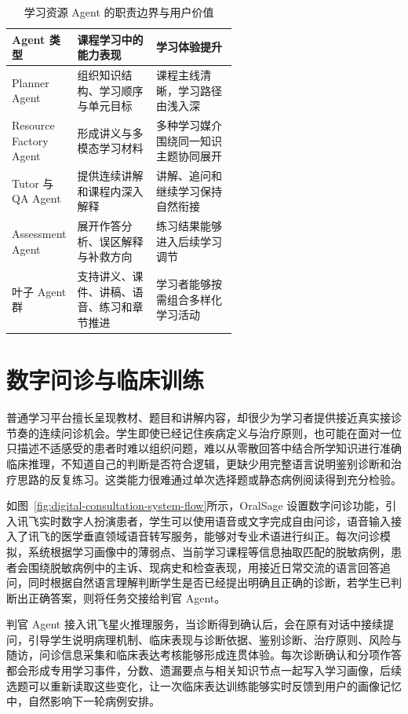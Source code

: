 \begin{table}[H]
  \centering
  \caption{学习资源 Agent 的职责边界与用户价值}
  \label{tab:agent-boundaries}
  \begin{tabularx}{\linewidth}{p{0.22\linewidth}p{0.35\linewidth}X}
    \toprule
    Agent 类型 & 课程学习中的能力表现 & 学习体验提升 \\
    \midrule
    Planner Agent & 组织知识结构、学习顺序与单元目标 & 课程主线清晰，学习路径由浅入深 \\
    Resource Factory Agent & 形成讲义与多模态学习材料 & 多种学习媒介围绕同一知识主题协同展开 \\
    Tutor 与 QA Agent & 提供连续讲解和课程内深入解释 & 讲解、追问和继续学习保持自然衔接 \\
    Assessment Agent & 展开作答分析、误区解释与补救方向 & 练习结果能够进入后续学习调节 \\
    叶子 Agent 群 & 支持讲义、课件、讲稿、语音、练习和章节推进 & 学习者能够按需组合多样化学习活动 \\
    \bottomrule
  \end{tabularx}
\end{table}

\section{数字问诊与临床训练}
\label{sec:digital-consultation}

普通学习平台擅长呈现教材、题目和讲解内容，却很少为学习者提供接近真实接诊节奏的连续问诊机会。学生即使已经记住疾病定义与治疗原则，也可能在面对一位只描述不适感受的患者时难以组织问题，难以从零散回答中结合所学知识进行准确临床推理，不知道自己的判断是否符合逻辑，更缺少用完整语言说明鉴别诊断和治疗思路的反复练习。这类能力很难通过单次选择题或静态病例阅读得到充分检验。

如图~\ref{fig:digital-consultation-system-flow}所示，OralSage 设置数字问诊功能，引入讯飞实时数字人扮演患者，学生可以使用语音或文字完成自由问诊，语音输入接入了讯飞的医学垂直领域语音转写服务，能够对专业术语进行纠正。每次问诊模拟，系统根据学习画像中的薄弱点、当前学习课程等信息抽取匹配的脱敏病例，患者会围绕脱敏病例中的主诉、现病史和检查表现，用接近日常交流的语言回答追问，同时根据自然语言理解判断学生是否已经提出明确且正确的诊断，若学生已判断出正确答案，则将任务交接给判官 Agent。

判官 Agent 接入讯飞星火推理服务，当诊断得到确认后，会在原有对话中接续提问，引导学生说明病理机制、临床表现与诊断依据、鉴别诊断、治疗原则、风险与随访，问诊信息采集和临床表达考核能够形成连贯体验。每次诊断确认和分项作答都会形成专用学习事件，分数、遗漏要点与相关知识节点一起写入学习画像，后续选题可以重新读取这些变化，让一次临床表达训练能够实时反馈到用户的画像记忆中，自然影响下一轮病例安排。

